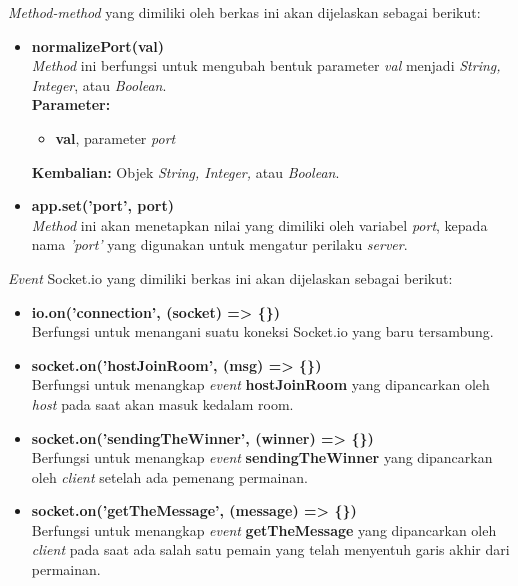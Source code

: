 \begin{enumerate}
\begin{enumerate}
		\textit{Method-method} yang dimiliki oleh berkas ini akan dijelaskan sebagai berikut:
		\begin{itemize}
			\item \textbf{normalizePort(val)} \\
			\textit{Method} ini berfungsi untuk mengubah bentuk parameter \textit{val} menjadi \textit{String, Integer}, atau \textit{Boolean}. \\
			\textbf{Parameter:}
			\begin{itemize}
				\item \textbf{val}, parameter \textit{port}
			\end{itemize}
			\textbf{Kembalian:} Objek \textit{String, Integer,} atau \textit{Boolean}. 
			
			\item \textbf{app.set('port', port)} \\
			\textit{Method} ini akan menetapkan nilai yang dimiliki oleh variabel \textit{port}, kepada nama \textit{'port'} yang digunakan untuk mengatur perilaku \textit{server}.
			
		\end{itemize}
	
		\textit{Event} Socket.io yang dimiliki berkas ini akan dijelaskan sebagai berikut:
		\begin{itemize}
			\item \textbf{io.on('connection', (socket) => \{\})} \\
			Berfungsi untuk menangani suatu koneksi Socket.io yang baru tersambung.
			
			\item \textbf{socket.on('hostJoinRoom', (msg) => \{\})} \\ 
			Berfungsi untuk menangkap \textit{event} \textbf{hostJoinRoom} yang dipancarkan oleh \textit{host} pada saat akan masuk kedalam room.
			
			\item \textbf{socket.on('sendingTheWinner', (winner) => \{\})} \\
			Berfungsi untuk menangkap \textit{event} \textbf{sendingTheWinner} yang dipancarkan oleh \textit{client} setelah ada pemenang permainan.
			
			\item \textbf{socket.on('getTheMessage', (message) => \{\})} \\
			Berfungsi untuk menangkap \textit{event} \textbf{getTheMessage} yang dipancarkan oleh \textit{client} pada saat ada salah satu pemain yang telah menyentuh garis akhir dari permainan.
			

\end{itemize}
\end{enumerate}
\end{enumerate}
